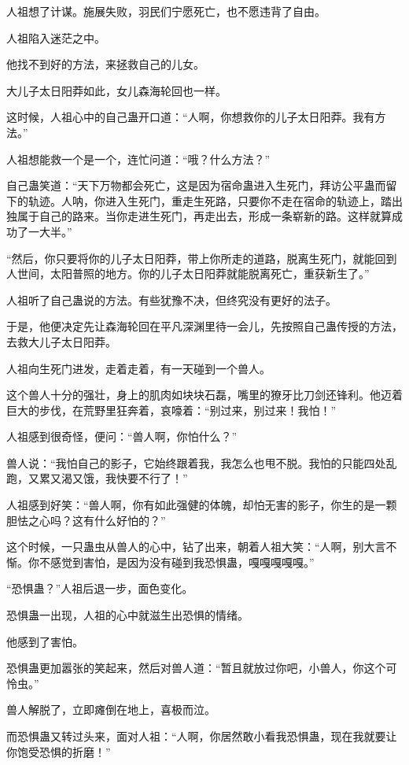 \begin{this_body}
人祖想了计谋。施展失败，羽民们宁愿死亡，也不愿违背了自由。

人祖陷入迷茫之中。

他找不到好的方法，来拯救自己的儿女。

大儿子太日阳莽如此，女儿森海轮回也一样。

这时候，人祖心中的自己蛊开口道：“人啊，你想救你的儿子太日阳莽。我有方法。”

人祖想能救一个是一个，连忙问道：“哦？什么方法？”

自己蛊笑道：“天下万物都会死亡，这是因为宿命蛊进入生死门，拜访公平蛊而留下的轨迹。人呐，你进入生死门，重走生死路，只要你不走在宿命的轨迹上，踏出独属于自己的路来。当你走进生死门，再走出去，形成一条崭新的路。这样就算成功了一大半。”

“然后，你只要将你的儿子太日阳莽，带上你所走的道路，脱离生死门，就能回到人世间，太阳普照的地方。你的儿子太日阳莽就能脱离死亡，重获新生了。”

人祖听了自己蛊说的方法。有些犹豫不决，但终究没有更好的法子。

于是，他便决定先让森海轮回在平凡深渊里待一会儿，先按照自己蛊传授的方法，去救大儿子太日阳莽。

人祖向生死门进发，走着走着，有一天碰到一个兽人。

这个兽人十分的强壮，身上的肌肉如块块石磊，嘴里的獠牙比刀剑还锋利。他迈着巨大的步伐，在荒野里狂奔着，哀嚎着：“别过来，别过来！我怕！”

人祖感到很奇怪，便问：“兽人啊，你怕什么？”

兽人说：“我怕自己的影子，它始终跟着我，我怎么也甩不脱。我怕的只能四处乱跑，又累又渴又饿，我快要不行了！”

人祖感到好笑：“兽人啊，你有如此强健的体魄，却怕无害的影子，你生的是一颗胆怯之心吗？这有什么好怕的？”

这个时候，一只蛊虫从兽人的心中，钻了出来，朝着人祖大笑：“人啊，别大言不惭。你不感觉到害怕，是因为没有碰到我恐惧蛊，嘎嘎嘎嘎嘎。”

“恐惧蛊？”人祖后退一步，面色变化。

恐惧蛊一出现，人祖的心中就滋生出恐惧的情绪。

他感到了害怕。

恐惧蛊更加嚣张的笑起来，然后对兽人道：“暂且就放过你吧，小兽人，你这个可怜虫。”

兽人解脱了，立即瘫倒在地上，喜极而泣。

而恐惧蛊又转过头来，面对人祖：“人啊，你居然敢小看我恐惧蛊，现在我就要让你饱受恐惧的折磨！”


\end{this_body}
